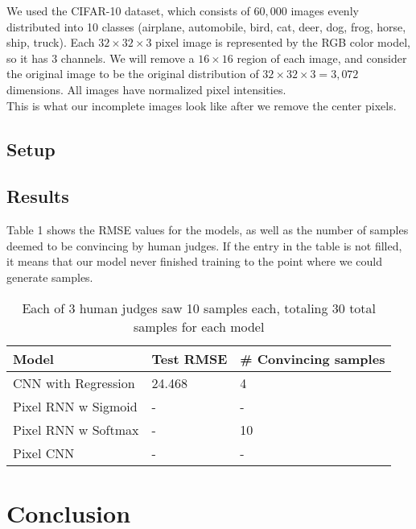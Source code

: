 \documentclass[10pt,twocolumn,letterpaper]{article}
\begin{document}
We used the CIFAR-10 dataset, which consists of $60,000$ images evenly distributed into 10 classes (airplane, automobile, bird, cat, deer, dog, frog, horse, ship, truck). Each $32 \times 32 \times 3$ pixel image is represented by the RGB color model, so it has 3 channels. We will remove a $16 \times 16$ region of each image, and consider the original image to be the original distribution of $32 \times 32 \times 3 = 3,072$ dimensions. All images have normalized pixel intensities. \\

This is what our incomplete images look like after we remove the center pixels.\\



\subsection{Setup}

\subsection{Results}
Table 1 shows the RMSE values for the models, as well as the number of samples deemed to be convincing by human judges. If the entry in the table is not filled, it means that our model never finished training to the point where we could generate samples.
\begin{table}[!ht]
\centering
\caption{Each of 3 human judges saw 10 samples each, totaling 30 total samples for each model}
\begin{tabular}{lll}
\hline
Model               & Test RMSE & \# Convincing samples \\ \hline
CNN with Regression & 24.468    &  4                     \\
Pixel RNN w Sigmoid &   -       &  -                     \\
Pixel RNN w Softmax &   -       &  10                     \\
Pixel CNN           &   -       &  -                     \\ \hline
\end{tabular}
\end{table}

\section{Conclusion}
\end{document}
